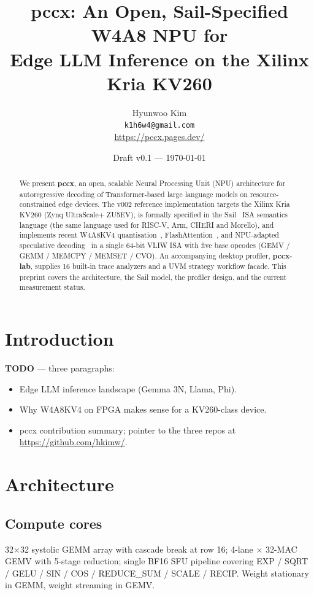 \documentclass[11pt,a4paper]{article}
\title{%
  pccx: An Open, Sail-Specified W4A8 NPU for\\
  Edge LLM Inference on the Xilinx Kria KV260
}
\author{%
  Hyunwoo Kim\\
  \texttt{k1h6w4@gmail.com}\\
  \small \url{https://pccx.pages.dev/}
}
\date{Draft v0.1 --- \today}
\begin{document}
\maketitle

\begin{abstract}
We present \textbf{pccx}, an open, scalable Neural Processing Unit
(NPU) architecture for autoregressive decoding of Transformer-based
large language models on resource-constrained edge devices.  The v002
reference implementation targets the Xilinx Kria KV260 (Zynq
UltraScale+ ZU5EV), is formally specified in the
Sail~\cite{armstrong2019isa} ISA semantics language (the same language
used for RISC-V, Arm, CHERI and Morello), and implements recent W4A8KV4
quantisation~\cite{qserve2024}, FlashAttention~\cite{dao2023flash2},
and NPU-adapted speculative decoding~\cite{openpangu2026} in a single
64-bit VLIW ISA with five base opcodes (GEMV / GEMM / MEMCPY /
MEMSET / CVO).  An accompanying desktop profiler, \textbf{pccx-lab},
supplies 16 built-in trace analyzers and a UVM strategy workflow facade.
This preprint covers the architecture, the Sail model, the
profiler design, and the current measurement status.
\end{abstract}

\section{Introduction}
\label{sec:introduction}

\textbf{TODO} — three paragraphs:
\begin{itemize}
  \item Edge LLM inference landscape (Gemma 3N, Llama, Phi).
  \item Why W4A8KV4 on FPGA makes sense for a KV260-class device.
  \item pccx contribution summary; pointer to the three repos at
        \url{https://github.com/hkimw/}.
\end{itemize}

\section{Architecture}
\label{sec:architecture}

\subsection{Compute cores}

32$\times$32 systolic GEMM array with cascade break at row 16;
4-lane $\times$ 32-MAC GEMV with 5-stage reduction; single BF16 SFU
pipeline covering EXP / SQRT / GELU / SIN / COS / REDUCE\_SUM /
SCALE / RECIP.  Weight stationary in GEMM, weight streaming in GEMV.
\end{document}
